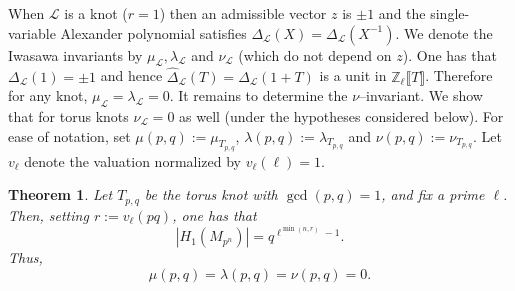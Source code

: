 \documentclass[table]{amsart}
\newtheorem{theorem}{Theorem}[section]
\newcommand{\cL}{\mathcal{L}}
\newcommand{\op}[1]{\operatorname{#1}}
\numberwithin{equation}{section}
\begin{document}
When $\cL$ is a knot ($r=1$) then an admissible vector $z$ is $\pm1$ and the
single-variable Alexander polynomial satisfies $\Delta_{\cL}(X)=\Delta_{\cL}(X^{-1})$. We denote the Iwasawa invariants by $\mu_{\cL}, \lambda_{\cL}$ and $\nu_{\cL}$ (which do not depend on $z$). One has that $\Delta_{\cL}(1)=\pm1$ and hence $\widehat{\Delta}_{\cL}(T)=\Delta_{\cL}(1+T)$
is a unit in $\mathbb{Z}_\ell\llbracket T\rrbracket$. Therefore for any knot, $\mu_\cL=\lambda_\cL=0$. It remains to determine the $\nu$--invariant.  We show that for torus knots
$\nu_{\cL}=0$ as well (under the hypotheses considered below). For ease of notation, set $\mu(p,q):=\mu_{T_{p,q}}$, $\lambda(p,q):=\lambda_{T_{p,q}}$ and $\nu(p,q):=\nu_{T_{p,q}}$. Let $v_\ell$ denote the valuation normalized by $v_\ell(\ell)=1$.

\begin{theorem}\label{thm 5.3}
Let $T_{p,q}$ be the torus knot with $\gcd(p,q)=1$, and fix a prime $\ell$. Then, setting $r:=v_\ell(pq)$, one has that \[|H_1(M_{p^n})|=q^{\ell^{\op{min}(n,r)}-1}.\]
Thus,\[\mu(p,q)=\lambda(p,q)=\nu(p,q)=0.\]
\end{theorem}
\end{document}
